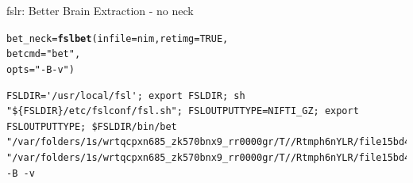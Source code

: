 \documentclass[11pt]{beamer}\usepackage[]{graphicx}\usepackage[]{color}
\makeatletter
\newcommand{\hlnum}[1]{\textcolor[rgb]{0.686,0.059,0.569}{#1}}%
\newcommand{\hlstr}[1]{\textcolor[rgb]{0.192,0.494,0.8}{#1}}%
\newcommand{\hlstd}[1]{\textcolor[rgb]{0.345,0.345,0.345}{#1}}%
\newcommand{\hlkwb}[1]{\textcolor[rgb]{0.69,0.353,0.396}{#1}}%
\newcommand{\hlkwc}[1]{\textcolor[rgb]{0.333,0.667,0.333}{#1}}%
\newcommand{\hlkwd}[1]{\textcolor[rgb]{0.737,0.353,0.396}{\textbf{#1}}}%
\newenvironment{kframe}{%
 \def\at@end@of@kframe{}%
 \ifinner\ifhmode%
  \def\at@end@of@kframe{\end{minipage}}%
  \begin{minipage}{\columnwidth}%
 \fi\fi%
 \def\FrameCommand##1{\hskip\@totalleftmargin \hskip-\fboxsep
 \colorbox{shadecolor}{##1}\hskip-\fboxsep
     \hskip-\linewidth \hskip-\@totalleftmargin \hskip\columnwidth}%
 \MakeFramed {\advance\hsize-\width
   \@totalleftmargin\z@ \linewidth\hsize
   \@setminipage}}%
 {\par\unskip\endMakeFramed%
 \at@end@of@kframe}
\newenvironment{knitrout}{}{} %
\makeatother
\begin{document}
\begin{frame}[fragile]{fslr: Better Brain Extraction - no neck}


\begin{knitrout}
\color{fgcolor}\begin{kframe}
\begin{alltt}
\hlstd{bet_neck} \hlkwb{=} \hlkwd{fslbet}\hlstd{(}\hlkwc{infile}\hlstd{=nim,} \hlkwc{retimg}\hlstd{=}\hlnum{TRUE}\hlstd{,}
                  \hlkwc{betcmd} \hlstd{=} \hlstr{"bet"}\hlstd{,}
                  \hlkwc{opts} \hlstd{=} \hlstr{"-B -v"} \hlstd{)}
\end{alltt}
\begin{verbatim}
FSLDIR='/usr/local/fsl'; export FSLDIR; sh "${FSLDIR}/etc/fslconf/fsl.sh"; FSLOUTPUTTYPE=NIFTI_GZ; export FSLOUTPUTTYPE; $FSLDIR/bin/bet "/var/folders/1s/wrtqcpxn685_zk570bnx9_rr0000gr/T//Rtmph6nYLR/file15bd443589fd8.nii.gz" "/var/folders/1s/wrtqcpxn685_zk570bnx9_rr0000gr/T//Rtmph6nYLR/file15bd458286277" -B -v 
\end{verbatim}
\end{kframe}
\end{knitrout}
\end{frame}
\end{document}
